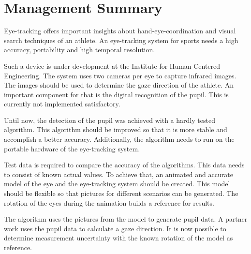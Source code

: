 \chapter*{Management Summary}
\label{chap:managementSummary}

Eye-tracking offers important insights about hand-eye-coordination and visual search techniques of an athlete. An eye-tracking system for sports needs a high accuracy, portability and high temporal resolution.

Such a device is under development at the Institute for Human Centered Engineering. The system uses two cameras per eye to capture infrared images. The images should be used to determine the gaze direction of the athlete. An important component for that is the digital recognition of the pupil. This is currently not implemented satisfactory.

Until now, the detection of the pupil was achieved with a hardly tested algorithm. This algorithm should be improved so that it is more stable and accomplish a better accuracy. Additionally, the algorithm needs to run on the portable hardware of the eye-tracking system.

Test data is required to compare the accuracy of the algorithms. This data needs to consist of known actual values. To achieve that, an animated and accurate model of the eye and the eye-tracking system should be created. This model should be flexible so that pictures for different scenarios can be generated. The rotation of the eyes during the animation builds a reference for results.

The algorithm uses the pictures from the model to generate pupil data. A partner work uses the pupil data to calculate a gaze direction. It is now possible to determine measurement uncertainty with the known rotation of the model as reference.